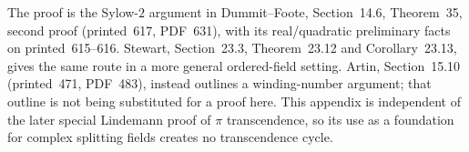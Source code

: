 \begin{remark}
The proof is the Sylow-$2$ argument in Dummit--Foote, Section~14.6, Theorem~35, second proof (printed~617, PDF~631), with its real/quadratic preliminary facts on printed~615--616. Stewart, Section~23.3, Theorem~23.12 and Corollary~23.13, gives the same route in a more general ordered-field setting. Artin, Section~15.10 (printed~471, PDF~483), instead outlines a winding-number argument; that outline is not being substituted for a proof here. This appendix is independent of the later special Lindemann proof of $\pi$ transcendence, so its use as a foundation for complex splitting fields creates no transcendence cycle.
\end{remark}
